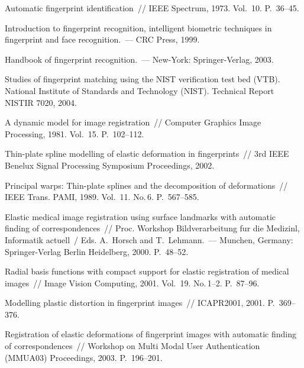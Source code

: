 \begin{multicols}{2}
{\small\frenchspacing
{%
\begin{thebibliography}{99}    
Automatic fingerprint identification~// IEEE Spectrum, 1973. Vol.~10. P.~36--45.

Introduction to fingerprint recognition, intelligent 
biometric techniques in fingerprint and face recognition.~--- CRC Press, 1999.

Handbook of fingerprint recognition.~--- New-York: Springer-Verlag, 2003.

Studies of fingerprint matching using the NIST verification test bed (VTB). 
National  Institute of Standards and Technology (NIST). Technical Report NISTIR 7020, 2004.


A dynamic model for image registration~// Computer Graphics Image 
Processing, 1981. Vol.~15. P.~102--112.

Thin-plate spline modelling of elastic deformation in 
fingerprints~// 3rd IEEE Benelux Signal Processing Symposium Proceedings, 2002.

 Principal warps: Thin-plate splines and the decomposition of  
deformations~// IEEE Trans. PAMI, 1989. Vol.~11. No.\,6. P.~567--585.

Elastic medical image registration using 
surface landmarks with automatic finding of correspondences~// 
Proc. Workshop Bildverarbeitung fur die Medizinl, Informatik actuell~/ Eds. A.~Horsch and T.~Lehmann.~--- 
Munchen, Germany: Springer-Verlag Berlin Heidelberg, 2000. P.~48--52.

Radial basis functions with compact support for 
elastic registration of medical images~// Image Vision Computing, 2001. Vol.~19. No.\,1--2.
P.~87--96.

Modelling plastic distortion in 
fingerprint images~// ICAPR2001, 2001. P.~369--376.

Registration of elastic deformations of fingerprint images 
with automatic finding of correspondences~// Workshop on Multi Modal User 
Authentication (MMUA03) Proceedings, 2003. P.~196--201.


\end{thebibliography}}}
\end{multicols}
